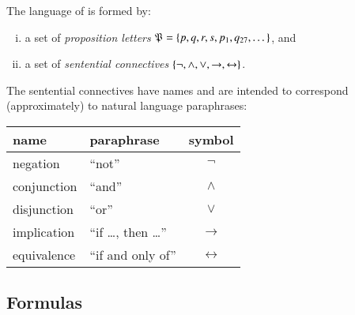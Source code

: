\documentclass[nobib,nofonts]{tufte-handout}
\newcommand{\proplog}{\acro{PropLog}}
\begin{document}
The language of \proplog is formed by:
\begin{enumerate}[(i)]
  \item a set of \emph{proposition letters} $\mathfrak{P} = \left\{p, q, r, s, p_{1}, q_{27}, \dots\right\}$, and
  \item a set of \emph{sentential connectives} $\left\{\neg, \wedge, \vee, \rightarrow, \leftrightarrow\right\}$.
\end{enumerate}
The sentential connectives have names and are intended to correspond (approximately) to natural language paraphrases:

\begin{center}
  \begin{tabular}{llc}
    name & paraphrase & symbol \\ \midrule
    negation     & ``not''   & $\neg$ \\
    conjunction  & ``and''   & $\wedge$ \\
    disjunction  & ``or''    & $\vee$ \\
    implication  & ``if \dots, then \dots''    & $\rightarrow$ \\
    equivalence  & ``if and only of''    & $\leftrightarrow$ \\
  \end{tabular}
\end{center}

\subsection{Formulas}
\end{document}
